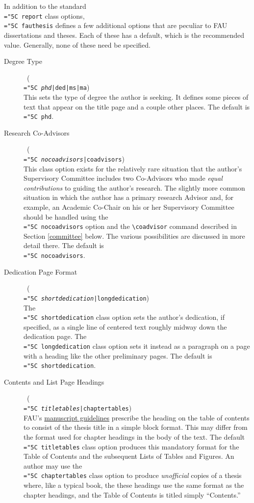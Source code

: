 \documentclass[11pt]{article}
\newcommand\guide{{http://www.fau.edu/graduate/forms-and-procedures/degree-completion/thesis-and-dissertation/index.php}}
\newcommand\code[1]{{\normalfont\texttt{\let\dv\textsl\chardef\\="5C #1}}}
\begin{document}
In addition to the standard \code{report} class options, \code{fauthesis} defines a few additional options that are peculiar to FAU dissertations and theses.  Each of these has a default, which is the recommended value.  Generally, none of these need be specified.
%
\begin{description}

\item[Degree Type] \dotfill\ (\code{\dv{phd}|ded|ms|ma})\\
This sets the type of degree the author is seeking.  It defines some pieces of text that appear on the title page and a couple other places.  The default is \code{phd}.

\item[Research Co-Advisors] \dotfill\ (\code{\dv{nocoadvisors}|coadvisors})\\
This class option exists for the relatively rare situation that the author's Supervisory Committee includes two Co-Advisors who made \textit{equal contributions} to guiding the author's research.  The slightly more common situation in which the author has a primary research Advisor and, for example, an Academic Co-Chair on his or her Supervisory Committee should be handled using the \code{nocoadvisors} option and the \verb=\coadvisor= command described in Section \ref{committee} below.  The various possibilities are discussed in more detail there.  The default is \code{nocoadvisors}.

\item[Dedication Page Format] \dotfill\ (\code{\dv{shortdedication}|longdedication})\\
The \code{shortdedication} class option sets the author's dedication, if specified, as a single line of centered text roughly midway down the dedication page.  The \code{longdedication} class option sets it instead as a paragraph on a page with a heading like the other preliminary pages.  The default is \code{shortdedication}.

\item[Contents and List Page Headings] \dotfill\ (\code{\dv{titletables}|chaptertables})\\
FAU's \href{\guide}{manuscript guidelines} prescribe the heading on the table of contents to consist of the thesis title in a simple block format.  This may differ from the format used for chapter headings in the body of the text.  The default \code{titletables} class option produces this mandatory format for the Table of Contents and the subsequent Lists of Tables and Figures.  An author may use the \code{chaptertables} class option to produce \textit{unofficial} copies of a thesis where, like a typical book, the these headings use the same format as the chapter headings, and the Table of Contents is titled simply ``Contents.''


\end{description}
\end{document}
